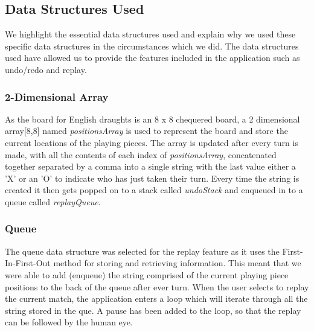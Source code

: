 \documentclass[10pt, a4paper]{article}
\begin{document}
    \subsection{Data Structures Used}
    We highlight the essential data structures used and 
    \newline
    explain why we used these specific data structures in the circumstances which we did. The data structures used have allowed us to provide the features included in the application such as undo/redo and replay.  
     
    
    \subsubsection{2-Dimensional Array}   
    As the board for English draughts is an 8 x 8 chequered board, a 2 dimensional array[8,8] named \textit{positionsArray} is used to represent the board and store the current 
    \newline 
    locations of the playing pieces. The array is updated 
    \newline
    after every turn is made, with all the contents of each 
    \newline
    index of \textit{positionsArray}, concatenated together separated by a comma into a single string with the last value either a 'X' or an 'O' to indicate who has just taken their turn. Every time the string is created it then gets popped on to a stack called \textit{undoStack} and enqueued in to a queue called \textit{replayQueue}. 
    
    \subsubsection{Queue}
    The queue data structure was selected for the replay 
    \newline
    feature as it uses the First-In-First-Out method for 
    \newline
    storing and retrieving information. This meant that we were able to add (enqueue) the string comprised of the current playing piece positions to the back of the queue after ever turn. When the user selects to replay the 
    \newline
    current match, the application enters a loop which will 
    \newline
    iterate through all the string stored in the que. A pause has been added to the loop, so that the replay can be followed by the human eye.
    
\end{document}
